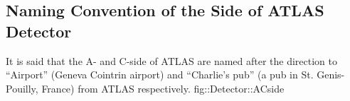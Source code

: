 \subsection*{Naming Convention of the Side of ATLAS Detector}
{It is said that the A- and C-side of ATLAS are named after the direction to ``Airport'' (Geneva Cointrin airport) and ``Charlie's pub'' (a pub in St. Genis-Pouilly, France) from ATLAS respectively.}
{fig::Detector::ACside}
